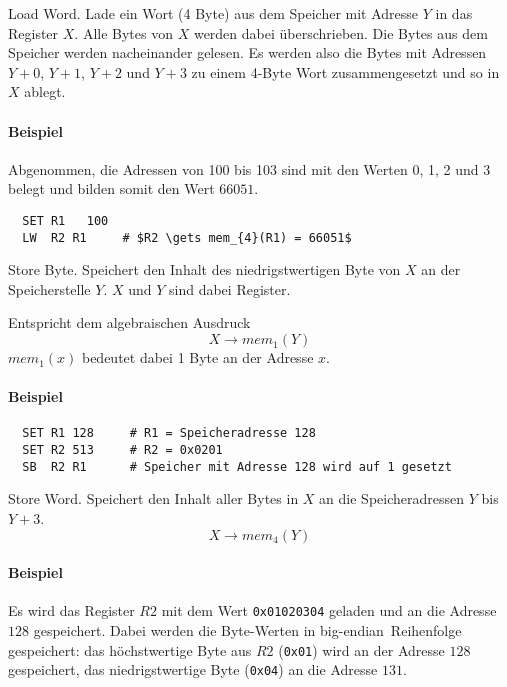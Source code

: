 \glqq Load Word\grqq.
Lade ein Wort (4 Byte) aus dem Speicher mit Adresse $Y$ in das Register $X$.
Alle Bytes von $X$ werden dabei überschrieben.
Die Bytes aus dem Speicher werden nacheinander gelesen. Es werden also die
Bytes mit Adressen $Y + 0$, $Y + 1$, $Y + 2$ und $Y + 3$ zu
einem 4-Byte Wort zusammengesetzt und so in $X$ ablegt.

\paragraph{Beispiel}
Abgenommen, die Adressen von 100 bis 103 sind mit den Werten 0, 1, 2 und 3
belegt und bilden somit den Wert $66051$.
\begin{lstlisting}
  SET R1   100
  LW  R2 R1     # $R2 \gets mem_{4}(R1) = 66051$
\end{lstlisting}




\glqq Store Byte\grqq.
Speichert den Inhalt des niedrigstwertigen Byte von $X$ an der Speicherstelle
$Y$. $X$ und $Y$ sind dabei Register.

Entspricht dem algebraischen Ausdruck
\[
    X \to mem_{1} (Y)
\]
$mem_{1}(x)$ bedeutet dabei 1 Byte an der Adresse $x$.

\paragraph{Beispiel}
\begin{lstlisting}
  SET R1 128     # R1 = Speicheradresse 128
  SET R2 513     # R2 = 0x0201
  SB  R2 R1      # Speicher mit Adresse 128 wird auf 1 gesetzt
\end{lstlisting}




\glqq Store Word\grqq.
Speichert den Inhalt aller Bytes in $X$ an die Speicheradressen $Y$ bis 
$Y + 3$.
\[
    X \to mem_{4}(Y)
\]
\paragraph{Beispiel}
Es wird das Register $R2$ mit dem Wert \texttt{0x01020304} geladen und an die
Adresse $128$ gespeichert. Dabei werden die Byte-Werten in 
\glqq big-endian\grqq\ Reihenfolge gespeichert: das höchstwertige Byte aus $R2$
(\texttt{0x01}) wird an der Adresse $128$ gespeichert, das niedrigstwertige
Byte (\texttt{0x04}) an die Adresse $131$.

